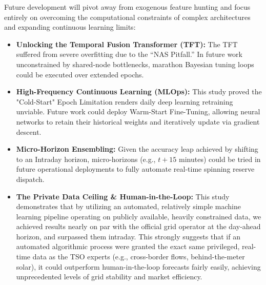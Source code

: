 \documentclass{article}
\begin{document}
Future development will pivot away from exogenous feature hunting and focus entirely on overcoming the computational constraints of complex architectures and expanding continuous learning limits:
\begin{itemize}
    \item \textbf{Unlocking the Temporal Fusion Transformer (TFT):} The TFT suffered from severe overfitting due to the ``NAS Pitfall.'' In future work unconstrained by shared-node bottlenecks, marathon Bayesian tuning loops could be executed over extended epochs.
    \item \textbf{High-Frequency Continuous Learning (MLOps):} This study proved the "Cold-Start" Epoch Limitation renders daily deep learning retraining unviable. Future work could deploy Warm-Start Fine-Tuning, allowing neural networks to retain their historical weights and iteratively update via gradient descent.
    \item \textbf{Micro-Horizon Ensembling:} Given the accuracy leap achieved by shifting to an Intraday horizon, micro-horizons (e.g., $t+15$ minutes) could be tried in future operational deployments to fully automate real-time spinning reserve dispatch.
    \item \textbf{The Private Data Ceiling \& Human-in-the-Loop:} This study demonstrates that by utilizing an automated, relatively simple machine learning pipeline operating on publicly available, heavily constrained data, we achieved results nearly on par with the official grid operator at the day-ahead horizon, and surpassed them intraday. This strongly suggests that if an automated algorithmic process were granted the exact same privileged, real-time data as the TSO experts (e.g., cross-border flows, behind-the-meter solar), it could outperform human-in-the-loop forecasts fairly easily, achieving unprecedented levels of grid stability and market efficiency.
\end{itemize}
\end{document}
